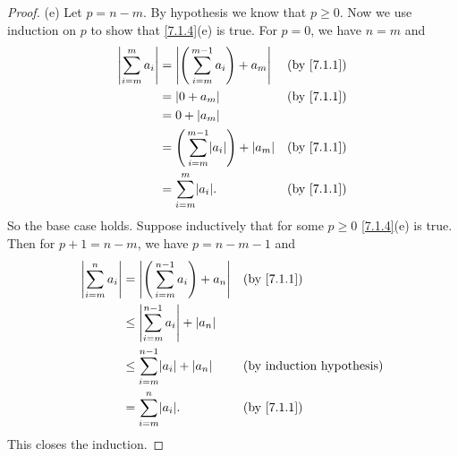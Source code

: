 \begin{proof}{(e)}
  Let \(p = n - m\).
  By hypothesis we know that \(p \geq 0\).
  Now we use induction on \(p\) to show that \cref{7.1.4}(e) is true.
  For \(p = 0\), we have \(n = m\) and
  \begin{align*}
    \abs{\sum_{i = m}^m a_i} & = \abs{\Bigg(\sum_{i = m}^{m - 1} a_i\Bigg) + a_m}       &  & \text{(by \cref{7.1.1})} \\
                             & = \abs{0 + a_m}                                          &  & \text{(by \cref{7.1.1})} \\
                             & = 0 + \abs{a_m}                                                                        \\
                             & = \Bigg(\sum_{i = m}^{m - 1} \abs{a_i}\Bigg) + \abs{a_m} &  & \text{(by \cref{7.1.1})} \\
                             & = \sum_{i = m}^m \abs{a_i}.                              &  & \text{(by \cref{7.1.1})}
  \end{align*}
  So the base case holds.
  Suppose inductively that for some \(p \geq 0\) \cref{7.1.4}(e) is true.
  Then for \(p + 1 = n - m\), we have \(p = n - m - 1\) and
  \begin{align*}
    \abs{\sum_{i = m}^n a_i} & = \abs{\Bigg(\sum_{i = m}^{n - 1} a_i\Bigg) + a_n} &  & \text{(by \cref{7.1.1})}         \\
                             & \leq \abs{\sum_{i = m}^{n - 1} a_i} + \abs{a_n}                                          \\
                             & \leq \sum_{i = m}^{n - 1} \abs{a_i} + \abs{a_n}    &  & \text{(by induction hypothesis)} \\
                             & = \sum_{i = m}^n \abs{a_i}.                        &  & \text{(by \cref{7.1.1})}
  \end{align*}
  This closes the induction.
\end{proof}

